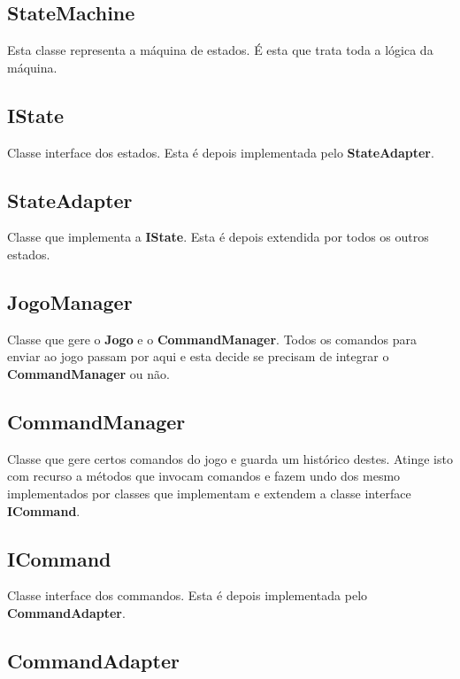 \documentclass[11pt]{article}
\begin{document}
	
	\large
	\subsection{StateMachine}
	\normalsize
	
	Esta classe representa a máquina de estados. É esta que trata toda a lógica da máquina.
	
	
	\large
	\subsection{IState}
	\normalsize
	
	Classe interface dos estados. Esta é depois implementada pelo \textbf{StateAdapter}.
	
	
	\large
	\subsection{StateAdapter}
	\normalsize
	
	Classe que implementa a \textbf{IState}. Esta é depois extendida por todos os outros estados.
	
	
	\large
	\subsection{JogoManager}
	\normalsize
	
	Classe que gere o \textbf{Jogo} e o \textbf{CommandManager}. Todos os comandos para enviar ao jogo passam por aqui e esta decide se precisam de integrar o \textbf{CommandManager} ou não.
	
	
	\large
	\subsection{CommandManager}
	\normalsize
	
	Classe que gere certos comandos do jogo e guarda um histórico destes. Atinge isto com recurso a métodos que invocam comandos e fazem undo dos mesmo implementados por classes que implementam e extendem a classe interface \textbf{ICommand}.
	
	
	\large
	\subsection{ICommand}
	\normalsize
	
	Classe interface dos commandos. Esta é depois implementada pelo \textbf{CommandAdapter}.
	
	
	\large
	\subsection{CommandAdapter}
	\normalsize
	
\end{document}
